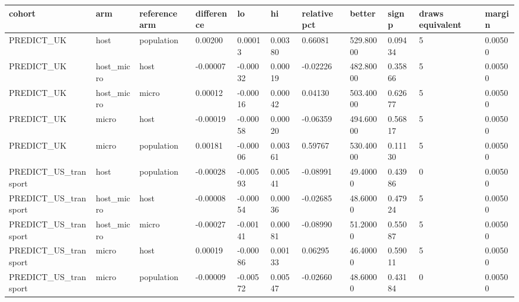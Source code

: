 {\footnotesize\setlength{\tabcolsep}{3pt}
\begin{longtable}{lllllllllll}
\toprule
\textbf{cohort} & \textbf{arm} & \textbf{reference arm} & \textbf{difference} & \textbf{lo} & \textbf{hi} & \textbf{relative pct} & \textbf{better} & \textbf{sign p} & \textbf{draws equivalent} & \textbf{margin} \\
\midrule
\endhead
PREDICT\_UK & host & population & 0.00200 & 0.00013 & 0.00380 & 0.66081 & 529.80000 & 0.09434 & 5 & 0.00500 \\
PREDICT\_UK & host\_micro & host & -0.00007 & -0.00032 & 0.00019 & -0.02226 & 482.80000 & 0.35866 & 5 & 0.00500 \\
PREDICT\_UK & host\_micro & micro & 0.00012 & -0.00016 & 0.00042 & 0.04130 & 503.40000 & 0.62677 & 5 & 0.00500 \\
PREDICT\_UK & micro & host & -0.00019 & -0.00058 & 0.00020 & -0.06359 & 494.60000 & 0.56817 & 5 & 0.00500 \\
PREDICT\_UK & micro & population & 0.00181 & -0.00006 & 0.00361 & 0.59767 & 530.40000 & 0.11130 & 5 & 0.00500 \\
PREDICT\_US\_transport & host & population & -0.00028 & -0.00593 & 0.00541 & -0.08991 & 49.40000 & 0.43986 & 0 & 0.00500 \\
PREDICT\_US\_transport & host\_micro & host & -0.00008 & -0.00054 & 0.00036 & -0.02685 & 48.60000 & 0.47924 & 5 & 0.00500 \\
PREDICT\_US\_transport & host\_micro & micro & -0.00027 & -0.00141 & 0.00081 & -0.08990 & 51.20000 & 0.55087 & 5 & 0.00500 \\
PREDICT\_US\_transport & micro & host & 0.00019 & -0.00086 & 0.00133 & 0.06295 & 46.40000 & 0.59011 & 5 & 0.00500 \\
PREDICT\_US\_transport & micro & population & -0.00009 & -0.00572 & 0.00547 & -0.02660 & 48.60000 & 0.43184 & 0 & 0.00500 \\
\bottomrule
\end{longtable}}
